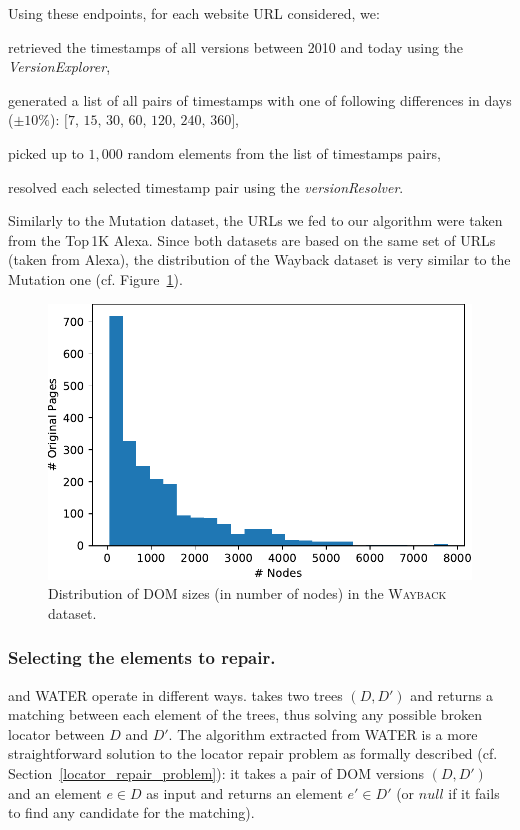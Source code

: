 Using these endpoints, for each website URL considered, we:
\begin{compactenum}
\item retrieved the timestamps of all versions between 2010 and today using the \textit{VersionExplorer},
\item generated a list of all pairs of timestamps with one of following differences in days ($\pm 10\%$): $\text{[7, 15, 30, 60, 120, 240, 360]}$,
\item picked up to $1,000$ random elements from the list of timestamps pairs,
\item resolved each selected timestamp pair using the \textit{versionResolver}.
\end{compactenum}

Similarly to the {\sc Mutation} dataset, the URLs we fed to our algorithm were taken from the Top\,1K Alexa.
Since both datasets are based on the same set of URLs (taken from Alexa), the distribution of the {\sc Wayback} dataset is very similar to the {\sc Mutation} one (cf. Figure~\ref{fig:distribution_wayback}).

\begin{figure}[h]
  \centering
  \includegraphics[width=.8\linewidth]{erratum/distribution_wayback}
  \caption{Distribution of DOM sizes (in number of nodes) in the \textsc{Wayback} dataset.}
  \label{fig:distribution_wayback}
\end{figure}

\subsubsection{Selecting the elements to repair.}
\erratum{} and WATER operate in different ways.
\erratum{} takes two trees $(D, D')$ and returns a matching between each element of the trees, thus solving any possible broken locator between $D$ and $D'$.
The algorithm extracted from WATER is a more straightforward solution to the locator repair problem as formally described (cf. Section~\ref{locator_repair_problem}): it takes a pair of DOM versions $(D,D')$ and an element $e \in D$ as input and returns an element $e' \in D'$ (or $null$ if it fails to find any candidate for the matching).

